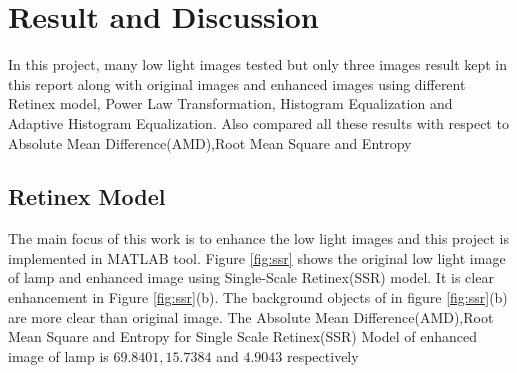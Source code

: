 \chapter{Result and Discussion}
In this project, many low light images tested but only three images result kept in this report along with original images and enhanced images using different Retinex model, Power Law Transformation\cite{plt1}, Histogram Equalization\cite{he1} and Adaptive Histogram Equalization\cite{he2}. Also compared all these results with respect to Absolute Mean Difference(AMD),Root Mean Square \cite{amd1} and Entropy\cite{entropy}
\section{Retinex Model}
The main focus of this work is to enhance the low light images and this project is implemented in MATLAB tool. Figure \ref{fig:ssr} shows the original low light image of lamp and enhanced image using Single-Scale Retinex(SSR) model\cite{retinex}. It is clear enhancement in Figure \ref{fig:ssr}(b). The background objects of in figure \ref{fig:ssr}(b) are more clear than original image. The Absolute Mean Difference(AMD),Root Mean Square and Entropy for Single Scale Retinex(SSR) Model of enhanced image of lamp is $69.8401,15.7384$ and $4.9043$ respectively      




